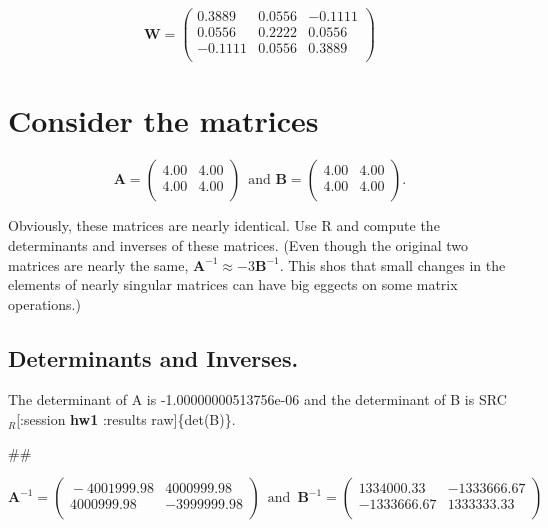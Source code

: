 \documentclass[11pt]{article}
\begin{document}
$$\mathbf{W} = 
\begin{pmatrix}{}
  0.3889 & 0.0556 & -0.1111 \\ 
  0.0556 & 0.2222 & 0.0556 \\ 
  -0.1111 & 0.0556 & 0.3889 \\ 
  \end{pmatrix}$$
\section{Consider the matrices}
\label{sec-3}




$$\mathbf{A} = 
\begin{pmatrix}{}
  4.00 & 4.00 \\ 
  4.00 & 4.00 \\ 
  \end{pmatrix}\,\textrm{ and }\mathbf{B} =
\begin{pmatrix}{}
  4.00 & 4.00 \\ 
  4.00 & 4.00 \\ 
  \end{pmatrix}.$$

Obviously, these matrices are nearly identical. Use R and compute the
determinants and inverses of these matrices. (Even though the
original two matrices are nearly the same, $\mathbf{A}^{-1} \approx
-3\mathbf{B}^{-1}$. This shos that small changes in the elements of
nearly singular matrices can have big eggects on some matrix
operations.)
\subsection{Determinants and Inverses.}
\label{sec-3-1}


The determinant of A is -1.00000000513756e-06
and the determinant of B is SRC$_R$[:session \textbf{hw1} :results
raw]\{det(B)\}.

\#\#

$$\mathbf{A}^{-1} = 
\begin{pmatrix}{}
  -4001999.98 & 4000999.98 \\ 
  4000999.98 & -3999999.98 \\ 
  \end{pmatrix}\, \textrm{ and }\, 
\mathbf{B}^{-1}  =
\begin{pmatrix}{}
  1334000.33 & -1333666.67 \\ 
  -1333666.67 & 1333333.33 \\ 
  \end{pmatrix}$$
\end{document}
